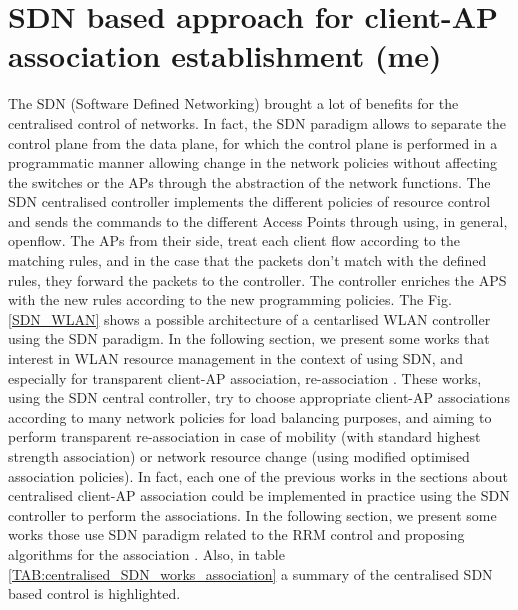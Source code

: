 \documentclass[journal,transmag]{IEEEtran}
\begin{document}
\section{SDN based approach for client-AP association establishment (me)}
The SDN (Software Defined Networking) brought a lot of benefits for the centralised control of networks. In fact, the SDN paradigm allows to separate the control plane from the data plane, for which the control plane is performed in a programmatic manner allowing change in the network policies without affecting the switches or the APs through the abstraction of the network functions. The SDN centralised controller implements the different policies of resource control and sends the commands to the different Access Points through using, in general, openflow. The APs from their side, treat each client flow according to the matching rules, and in the case that the packets don't match with the defined rules, they forward the packets to the controller. The controller enriches the APS with the new rules according to the new programming policies. The Fig.\ref{SDN_WLAN} shows a possible architecture of a centarlised WLAN controller using the SDN paradigm. In the following section, we present some works that interest in WLAN resource management in the context of using SDN, and especially for transparent client-AP association, re-association \cite{05DIRAC, 14Odin:Programmatic_Orchestration_WiFi,15OpenSDWN_home_entreprise_WIFI,16VALI_SDN,17building_SDN_entreprise_virtual_AP}. These works, using the SDN central controller, try to choose appropriate client-AP associations according to many network policies for load balancing purposes, and aiming to perform transparent re-association in case of mobility (with standard highest strength association) or network resource change (using modified optimised association policies). In fact, each one of the previous works in the sections about centralised client-AP association could be implemented in practice using the SDN controller to perform the associations. In the following section, we present some works those use SDN paradigm related to the RRM control and proposing algorithms for the association \cite{08Design_high_wifi_entreprise,10Dyson,17QOS_AP_selection}. Also, in table \ref{TAB:centralised_SDN_works_association} a summary of the centralised SDN based control is highlighted. 
\end{document}
